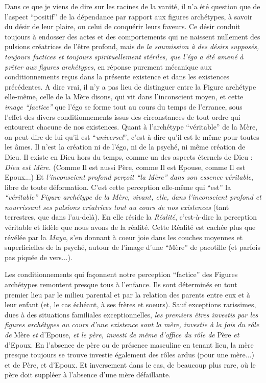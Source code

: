 Dans ce que je viens de dire sur les racines de la vanité, il n'a été question que de l'aspect ``positif'' de la dépendance par rapport aux figures archétypes, à savoir du désir de leur plaire, ou celui de conquérir leurs faveurs. Ce désir conduit toujours à endosser des actes et des comportements qui ne naissent nullement des pulsions créatrices de l'être profond, mais de \textit{la soumission à des désirs supposés, toujours factices et toujours spirituellement stériles, que l'égo a été amené à prêter aux figures archétypes}, en réponse purement mécanique aux conditionnements reçus dans la présente existence et dans les existences précédentes. A dire vrai, il n'y a pas lieu de distinguer entre la Figure archétype elle-même, celle de la Mère disons, qui vit dans l'inconscient moyen, et cette \textit{image ``factice''} que l'égo se forme tout au cours du temps de l'errance, sous l'effet des divers conditionnements issus des circonstances de tout ordre qui entourent chacune de nos existences. Quant à l'archétype ``véritable'' de la Mère, on peut dire de lui qu'il est ``\textit{universel}'', c'est-à-dire qu'il est le même pour toutes les âmes. Il n'est la création ni de l'égo, ni de la psyché, ni même création de Dieu. Il existe en Dieu hors du temps, comme un des aspects éternels de Dieu : \textit{Dieu est Mère.} (Comme Il est aussi Père, comme Il est Epouse, comme Il est Epoux...) Et \textit{l'inconscient profond perçoit ``la Mère'' dans son essence véritable}, libre de toute déformation. C'est cette perception elle-même qui ``est'' la \textit{``véritable'' Figure archétype de la Mère, vivant, elle, dans l'inconscient profond et nourrissant ses pulsions créatrices tout au cours de nos existences} (tant terrestres, que dans l'au-delà). En elle réside la \textit{Réalité}, c'est-à-dire la perception véritable et fidèle que nous avons de la réalité. Cette Réalité est cachée plus que révélée par la \textit{Maya}, s'en donnant à coeur joie dans les couches moyennes et superficielles de la psyché, autour de l'image d'une ``Mère'' de pacotille (et parfois pas piquée de vers...).

Les conditionnements qui façonnent notre perception ``factice'' des Figures archétypes remontent presque tous à l'enfance. Ils sont déterminés en tout premier lieu par le milieu parental et par la relation des parents entre eux et à leur enfant (et, le cas échéant, à ses frères et soeurs). Sauf exceptions rarissimes, dues à des situations familiales exceptionnelles, \textit{les premiers êtres investis par les figures archétypes au cours d'une existence sont la mère, investie à la fois du rôle de} Mère \textit{et} d'Epouse, \textit{et le père, investi de même d'office du rôle de} Père \textit{et} d'Epoux. En l'absence de père ou de présence masculine en tenant lieu, la mère presque toujours se trouve investie également des rôles ardus (pour une mère...) et de Père, et d'Epoux. Et inversement dans le cas, de beaucoup plus rare, où le père doit suppléer à l'absence d'une mère défaillante.


